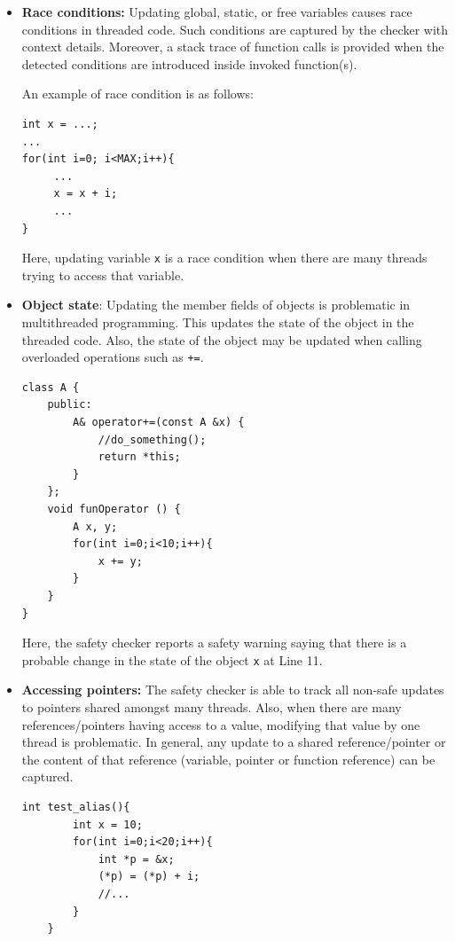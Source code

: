 \begin{itemize}
\item \textbf{Race conditions:} Updating global, static, or free variables causes race conditions in threaded code. Such conditions are captured by the checker with context details. Moreover, a stack trace of function calls is provided when the detected conditions are introduced inside invoked function(s).

An example of race condition is as follows:
\begin{lstlisting}[label=code:filtering_generated,caption={Race Condition}]
int x = ...;
...
for(int i=0; i<MAX;i++){
     ...
     x = x + i;
     ...
}
\end{lstlisting}
Here, updating variable \texttt{x} is a race condition when there are many threads trying to access that variable.

\item \textbf{Object state}: Updating the member fields of objects is problematic in multithreaded programming. This updates the state of the object in the threaded code. Also, the state of the object may be updated when calling overloaded operations such as \texttt{+=}.

\begin{lstlisting}[label=code:filtering_generated,caption={Object State}]
class A {
    public:
        A& operator+=(const A &x) {
            //do_something();
            return *this;
        }
    };
    void funOperator () {
        A x, y;
        for(int i=0;i<10;i++){
            x += y;
        }
    }
}
\end{lstlisting}    
    
Here, the safety checker reports a safety warning saying that there is a probable change in the state of the object \texttt{x} at Line 11.

\item \textbf{Accessing pointers:} The safety checker is able to track all non-safe updates to pointers shared amongst many threads. Also, when there are many references/pointers having access to a value, modifying that value by one thread is problematic. In general, any update to a shared reference/pointer or the content of that reference (variable, pointer or function reference) can be captured.

\begin{lstlisting}[label=code:filtering_generated,caption={Object State}]
 int test_alias(){
        int x = 10;
        for(int i=0;i<20;i++){
            int *p = &x;
            (*p) = (*p) + i;
            //...
        }
    }
\end{lstlisting}


\end{itemize}
